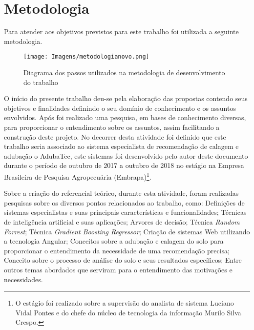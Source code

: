 \documentclass[
12pt,				%
oneside,			%
a4paper,			%
english,			%
french,				%
spanish,			%
brazil				%
]{abntex2}
\begin{document}
\chapter{Metodologia}

Para atender aos objetivos previstos para este trabalho foi utilizada a seguinte metodologia.


\begin{figure}[ht]
	\begin{minipage}[b]{\linewidth}
		\caption{Diagrama dos passos utilizados na metodologia de desenvolvimento do trabalho }
		\centering %
		\texttt{[image: Imagens/metodologianovo.png]} \quad %
		\label{figura:Metodologia}
		
	\end{minipage}
	\hspace{0.5cm}
\end{figure}


O início do presente trabalho deu-se pela elaboração das propostas contendo seus objetivos e finalidades definindo o seu domínio de conhecimento e os assuntos envolvidos. Após foi realizado uma pesquisa, em bases de conhecimento diversas, para proporcionar o entendimento sobre os assuntos, assim facilitando a construção deste projeto.
No decorrer desta atividade foi definido que este trabalho seria associado ao sistema especialista de recomendação de calagem e adubação o AdubaTec, este sistemas foi desenvolvido pelo autor deste documento durante o período de outubro de 2017 a outubro de 2018 no estágio na Empresa Brasileira de Pesquisa Agropecuária (Embrapa)\footnote{O estágio foi realizado sobre a supervisão do analista de sistema Luciano Vidal Pontes e do chefe do núcleo de tecnologia da informação Murilo Silva Crespo.}. 

Sobre a criação do referencial teórico, durante esta atividade, foram realizadas pesquisas sobre os diversos pontos relacionados ao trabalho, como: Definições de sistemas especialistas e suas principais características e  funcionalidades; Técnicas de inteligência artificial e suas aplicações; Arvores de decisão; Técnica \textit{Random Forrest}; Técnica \textit{Gradient Boosting Regressor}; Criação de sistemas Web utilizando a tecnologia Angular\textsuperscript{\textregistered}; Conceitos sobre a adubação e calagem do solo para proporcionar o entendimento da necessidade de uma recomendação precisa; Conceito sobre o processo de análise do solo e  seus resultados específicos; Entre outros temas abordados que serviram para o entendimento das motivações e necessidades.  
\end{document}
